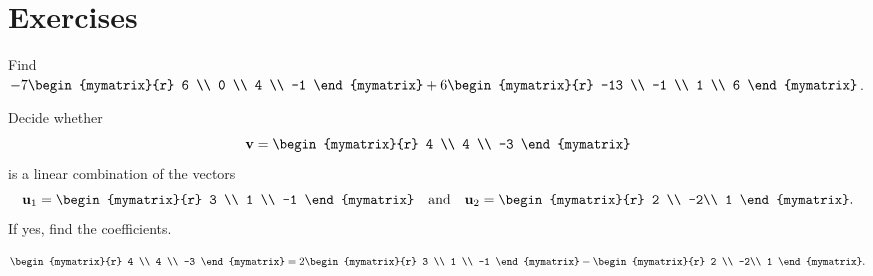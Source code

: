 \section*{Exercises}


\begin{ex}
  Find $-7\begin{mymatrix}{r}
    6 \\
    0 \\
    4 \\
    -1
  \end{mymatrix} +6\begin{mymatrix}{r}
    -13 \\
    -1 \\
    1 \\
    6
  \end{mymatrix}$. 
\end{ex}


\begin{ex}
  Decide whether 
  \begin{equation*}
    \vect{v}= \begin{mymatrix}{r}
      4 \\
      4 \\
      -3
    \end{mymatrix}
  \end{equation*}
  is a linear combination of the vectors 
  \begin{equation*}
    \vect{u}_1 = \begin{mymatrix}{r}
      3 \\
      1 \\
      -1
    \end{mymatrix}
    \quad\mbox{and}\quad
    \vect{u}_2 = 
    \begin{mymatrix}{r}
      2 \\
      -2\\
      1
    \end{mymatrix}.
  \end{equation*}
  If yes, find the coefficients.
  
  \begin{sol}
    \begin{equation*}
      \begin{mymatrix}{r}
        4 \\
        4 \\
        -3
      \end{mymatrix}
      =
      2
      \begin{mymatrix}{r}
        3 \\
        1 \\
        -1
      \end{mymatrix}
      -
      \begin{mymatrix}{r}
        2 \\
        -2\\
        1
      \end{mymatrix}.
    \end{equation*}
  \end{sol}
\end{ex}



